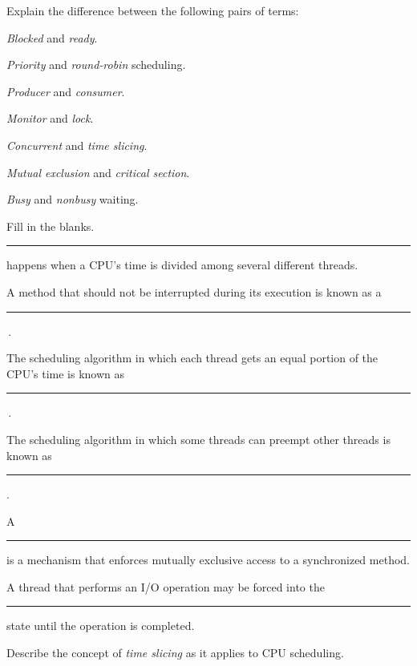 \label{exercises}

\begin{EXRtwo}
\item  Explain the difference between the following
pairs of terms:

\begin{EXRtwoLL}
\begin{multicols}{2}
\item  {\it Blocked} and {\it ready}.
\item  {\it Priority} and {\it round-robin} scheduling.
\item  {\it Producer} and {\it consumer}.
\item  {\it Monitor} and {\it lock}.
\item  {\it Concurrent} and {\it time slicing}.
\item  {\it Mutual exclusion} and {\it critical section}.
\item  {\it Busy} and {\it nonbusy} waiting.
\end{multicols}
\end{EXRtwoLL}


\item  Fill in the blanks.
\begin{EXRtwoLL}\baselineskip=12pt
\item  \rule{40pt}{0.5pt} happens when a CPU's time is divided among several
different threads.
\item  A method that should not be interrupted during its
execution is known as a  \rule{40pt}{0.5pt}\,.
\item  The scheduling algorithm in which each thread gets
an equal portion of the CPU's time is known as  \rule{40pt}{0.5pt}\,.
\item  The scheduling algorithm in which some threads can
preempt other threads is known as \rule{40pt}{0.5pt}.
\item  A \rule{40pt}{0.5pt} is a mechanism that enforces mutually exclusive
access to a synchronized method.
\item  A thread that performs an I/O operation may be forced
into the \rule{40pt}{0.5pt}  state until the operation is completed.
\end{EXRtwoLL}\baselineskip=11pt

\item  Describe the concept of {\it time slicing} as
it applies to CPU \mbox{scheduling.}


\end{EXRtwo}
